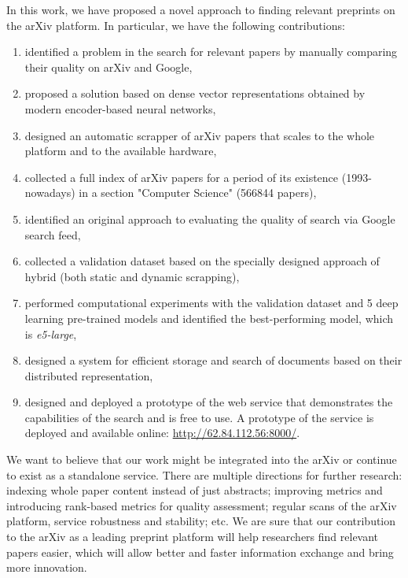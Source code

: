 \documentclass{article}
\begin{document}
        In this work, we have proposed a novel approach to finding relevant preprints on the arXiv platform. In particular, we have the following contributions:
        
        \begin{enumerate}
            \item identified a problem in the search for relevant papers by manually comparing their quality on arXiv and Google,
            \item proposed a solution based on dense vector representations obtained by modern encoder-based neural networks,
            \item designed an automatic scrapper of arXiv papers that scales to the whole platform and to the available hardware,
            \item collected a full index of arXiv papers for a period of its existence (1993-nowadays) in a section "Computer Science" (566844 papers),
            \item identified an original approach to evaluating the quality of search via Google search feed,
            \item collected a validation dataset based on the specially designed approach of hybrid (both static and dynamic scrapping),
            \item performed computational experiments with the validation dataset and 5 deep learning pre-trained models and identified the best-performing model, which is \textit{e5-large},
            \item designed a system for efficient storage and search of documents based on their distributed representation,
            \item designed and deployed a prototype of the web service that demonstrates the capabilities of the search and is free to use. A prototype of the service is deployed and available online: \url{http://62.84.112.56:8000/}.
        \end{enumerate}
        
        We want to believe that our work might be integrated into the arXiv or continue to exist as a standalone service. There are multiple directions for further research: indexing whole paper content instead of just abstracts; improving metrics and introducing rank-based metrics for quality assessment; regular scans of the arXiv platform, service robustness and stability; etc. We are sure that our contribution to the arXiv as a leading preprint platform will help researchers find relevant papers easier, which will allow better and faster information exchange and bring more innovation. 
    


\end{document}
